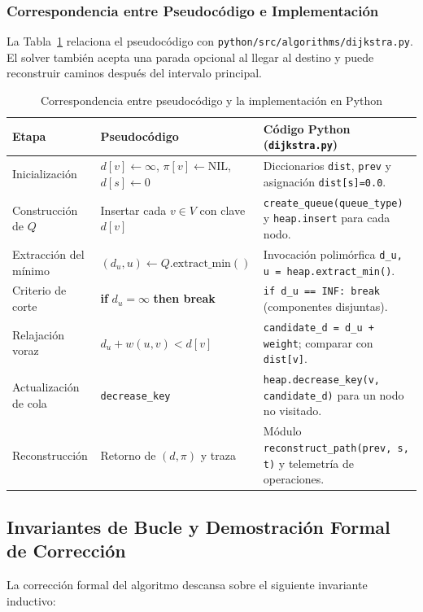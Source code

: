 \subsubsection{Correspondencia entre Pseudocódigo e Implementación}
La Tabla~\ref{tab:pseudo_codigo} relaciona el pseudocódigo con \texttt{python/src/algorithms/dijkstra.py}. El solver también acepta una parada opcional al llegar al destino y puede reconstruir caminos después del intervalo principal.

\begin{table}[H]
    \centering
    \fontsize{9}{11}\selectfont
    \caption{Correspondencia entre pseudocódigo y la implementación en Python}
    \label{tab:pseudo_codigo}
    \begin{tabularx}{\textwidth}{@{}>{\raggedright\arraybackslash}p{3.6cm} >{\raggedright\arraybackslash}p{5.0cm} X@{}}
        \toprule
        \textbf{Etapa} & \textbf{Pseudocódigo} & \textbf{Código Python (\texttt{dijkstra.py})} \\
        \midrule
        Inicialización & $d[v]\leftarrow\infty$, $\pi[v]\leftarrow\text{NIL}$, $d[s]\leftarrow0$ & Diccionarios \texttt{dist}, \texttt{prev} y asignación \texttt{dist[s]=0.0}. \\
        Construcción de $Q$ & Insertar cada $v\in V$ con clave $d[v]$ & \texttt{create\_queue(queue\_type)} y \texttt{heap.insert} para cada nodo. \\
        Extracción del mínimo & $(d_u,u)\leftarrow Q.\text{extract\_min}()$ & Invocación polimórfica \texttt{d\_u, u = heap.extract\_min()}. \\
        Criterio de corte & \textbf{if} $d_u = \infty$ \textbf{then break} & \texttt{if d\_u == INF: break} (componentes disjuntas). \\
        Relajación voraz & $d_u + w(u,v) < d[v]$ & \texttt{candidate\_d = d\_u + weight}; comparar con \texttt{dist[v]}. \\
        Actualización de cola & \texttt{decrease\_key} & \texttt{heap.decrease\_key(v, candidate\_d)} para un nodo no visitado. \\
        Reconstrucción & Retorno de $(d,\pi)$ y traza & Módulo \texttt{reconstruct\_path(prev, s, t)} y telemetría de operaciones. \\
        \bottomrule
    \end{tabularx}
\end{table}

\subsection{Invariantes de Bucle y Demostración Formal de Corrección}
La corrección formal del algoritmo descansa sobre el siguiente invariante inductivo:

